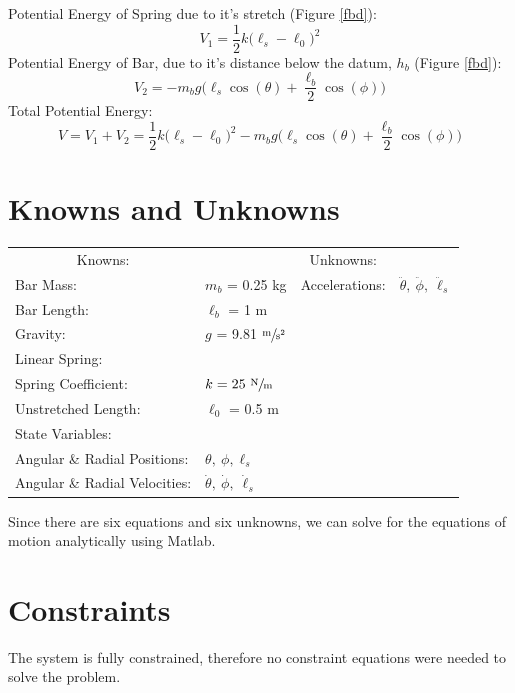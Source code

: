 \documentclass[12pt]{report}
\begin{document}
\begin{flushleft}
Potential Energy of Spring due to it's stretch (Figure \ref{fbd}):
$$V_1 = \frac{1}{2}k\big(\ell_s-\ell_0\big)^2$$
Potential Energy of Bar, due to it's distance below the datum, $h_{b}$ (Figure \ref{fbd}):
$$V_2 = - m_bg\big(\ell_s\cos(\theta) + \frac{\ell_b}{2}\cos(\phi)\big)$$
Total Potential Energy:
\begin{equation}
V = V_1 + V_2 = \frac{1}{2}k\big(\ell_s-\ell_0\big)^2 - m_bg\big(\ell_s\cos(\theta) + \frac{\ell_b}{2}\cos(\phi)\big)
\end{equation}
\newpage
\section{Knowns and Unknowns} \label{knownsandunknowns}
\begin{tabular}{ll@{\hskip .75in}ll}
  \multicolumn{1}{c}{Knowns:} && \multicolumn{1}{c}{Unknowns:} \\
  Bar Mass: &$m_b$ = 0.25 kg & Accelerations: & $\ddot{\theta},~\ddot{\phi},~\ddot{\ell}_s$ \\
  Bar Length: &$\ell_b$ = 1 m & \\
  Gravity: &$g$ = 9.81 $\sfrac{\text{m}}{\text{s$^2$}}$& \\
  Linear Spring: \\
  \quad Spring Coefficient:& $k = 25~\sfrac{\text{N}}{\text{m}}$\\
  \quad Unstretched Length:& $\ell_0$ = 0.5 m \\
  State Variables: \\
  \quad Angular \& Radial Positions: &$\theta,~\phi,\ell_s$ \\
  \quad Angular \& Radial Velocities: &$\dot{\theta},~\dot{\phi},~\dot{\ell}_s$ & \\
\end{tabular}
\vspace{2ex}

Since there are six equations and six unknowns, we can solve for the equations of
motion analytically using Matlab.

\section{Constraints}
The system is fully constrained, therefore no constraint equations were needed to
solve the problem.

\end{flushleft}
\end{document}
